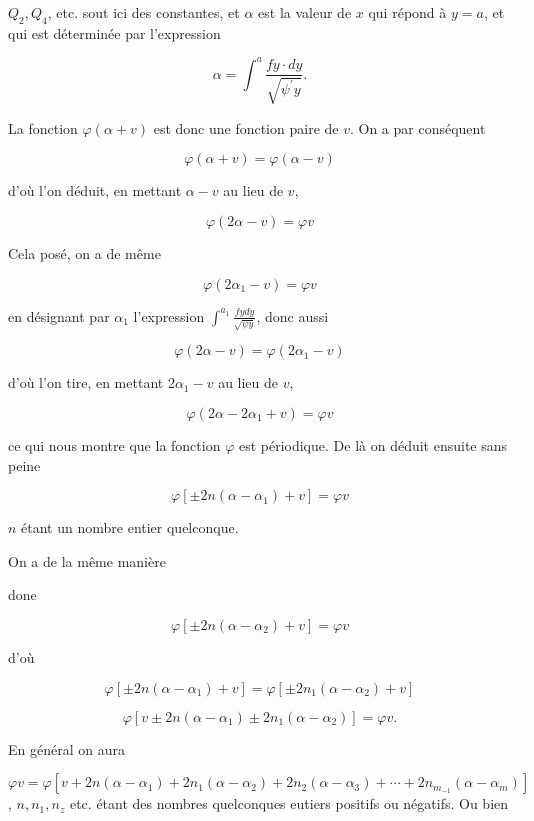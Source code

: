 \documentclass{article}
\begin{document}
\(Q_{2}, Q_{4}\), etc. sout ici des constantes, et \(\alpha\) est la valeur de \(x\) qui répond à \(y=a\), et qui est déterminée par l'expression

\[
\alpha=\int^{a} \frac{f y \cdot d y}{\sqrt{\psi^{\prime} y}} .
\]

La fonction \(\varphi(\alpha+v)\) est donc une fonction paire de \(v\). On a par conséquent

\[
\varphi(\alpha+v)=\varphi(\alpha-v)
\]

d'où l'on déduit, en mettant \(\alpha-v\) au lieu de \(v\),

\[
\varphi(2 \alpha-v)=\varphi v
\]

Cela posé, on a de même

\[
\varphi\left(2 \alpha_{1}-v\right)=\varphi v
\]

en désignant par \(\alpha_{1}\) l'expression \(\int^{a_{1}} \frac{f y d y}{\sqrt{\psi y}}\), donc aussi

\[
\varphi(2 \alpha-v)=\varphi\left(2 \alpha_{1}-v\right)
\]

d'où l'on tire, en mettant \(2 \alpha_{1}-v\) au lieu de \(v\),

\[
\varphi\left(2 \alpha-2 \alpha_{1}+v\right)=\varphi v
\]

ce qui nous montre que la fonction \(\varphi\) est périodique. De là on déduit ensuite sans peine

\[
\varphi\left[ \pm 2 n\left(\alpha-\alpha_{1}\right)+v\right]=\varphi v
\]

\(n\) étant un nombre entier quelconque.

On a de la même manière

done

\[
\varphi\left[ \pm 2 n\left(\alpha-\alpha_{2}\right)+v\right]=\varphi v
\]

d’où

\[
\varphi\left[ \pm 2 n\left(\alpha-\alpha_{1}\right)+v\right]=\varphi\left[ \pm 2 n_{1}\left(\alpha-\alpha_{2}\right)+v\right]
\]

\[
\varphi\left[v \pm 2 n\left(\alpha-\alpha_{1}\right) \pm 2 n_{1}\left(\alpha-\alpha_{2}\right)\right]=\varphi v .
\]

En général on aura

\(\varphi v=\varphi\left[v+2 n\left(\alpha-\alpha_{1}\right)+2 n_{1}\left(\alpha-\alpha_{2}\right)+2 n_{2}\left(\alpha-\alpha_{3}\right)+\cdots+2 n_{m_{-1}}\left(\alpha-\alpha_{m}\right)\right]\), \(n, n_{1}, n_{z}\) etc. étant des nombres quelconques eutiers positifs ou négatifs. Ou bien
\end{document}
